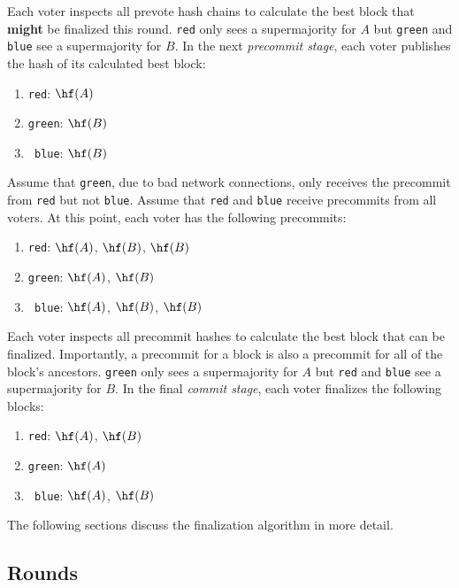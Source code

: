 Each voter inspects all prevote hash chains to calculate the best block that \textbf{might} be finalized this round.
\texttt{red} only sees a supermajority for $A$ but \texttt{green} and \texttt{blue} see a supermajority for $B$.
In the next \emph{precommit stage}, each voter publishes the hash of its calculated best block:

\begin{enumerate}
	\item{\texttt{\space\space red}: $\hf(A)$}
	\item{\texttt{green}: $\hf(B)$}
	\item{\texttt{ blue}: $\hf(B)$}
\end{enumerate}

Assume that \texttt{green}, due to bad network connections, only receives the precommit from \texttt{red} but not \texttt{blue}.
Assume that \texttt{red} and \texttt{blue} receive precommits from all voters.
At this point, each voter has the following precommits:

\begin{enumerate}
	\item{\texttt{\space\space red}: $\hf(A)$, $\hf(B)$, $\hf(B)$}
	\item{\texttt{green}: $\hf(A)$, $\hf(B)$}
	\item{\texttt{ blue}: $\hf(A)$, $\hf(B)$, $\hf(B)$}
\end{enumerate}

Each voter inspects all precommit hashes to calculate the best block that can be finalized.
Importantly, a precommit for a block is also a precommit for all of the block's ancestors.
\texttt{green} only sees a supermajority for $A$ but \texttt{red} and \texttt{blue} see a supermajority for $B$.
In the final \emph{commit stage}, each voter finalizes the following blocks:

\begin{enumerate}
	\item{\texttt{\space\space red}: $\hf(A)$, $\hf(B)$}
	\item{\texttt{green}: $\hf(A)$}
	\item{\texttt{ blue}: $\hf(A)$, $\hf(B)$}
\end{enumerate}

The following sections discuss the finalization algorithm in more detail.

\subsection{Rounds}

